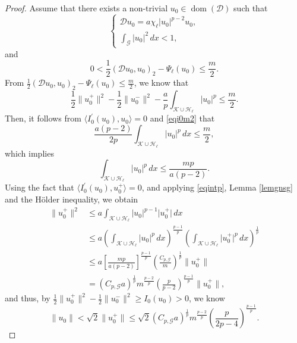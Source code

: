 \documentclass[11pt]{amsart}
\newcommand{\abs}[1]{\lvert#1\rvert}
\newcommand{\norm}[1]{\lVert#1\rVert}
\newcommand{\D}{\mathcal{D}}
\newcommand{\G}{\mathcal{G}}
\newcommand{\K}{\mathcal{K}}
\numberwithin{equation}{section}
\begin{document}
\begin{proof}
Assume that there exists a non-trivial $u_{0} \in \operatorname{dom}(\D)$ such that
    $$
\left\{\begin{array}{l}
\D u_{0}=a\chi_{\ell}\abs{u_{0}}^{p-2} u_{0}, \\
\int_{\G}\left|u_{0}\right|^{2} \,dx < 1,
\end{array}\right.
$$
and
$$
0<\frac{1}{2}(\D u_{0}, u_{0})_{2}-\Psi_\ell(u_{0})\leq\frac{m}{2}.
$$
From $\frac{1}{2}(\D u_{0}, u_{0})_{2}-\Psi_\ell(u_{0})\leq\frac{m}{2}$, we know that
\begin{equation}\label{eqi0m2}
        \frac{1}{2}\norm{u^+_{0}}^2 - \frac{1}{2}\norm{u^-_{0}}^2 - \frac{a}{p}\int_{\K\cup\mathcal{H}_\ell}\abs{u_{0}}^p \leq \frac{m}{2}.
\end{equation}
Then, it follows from $\langle I_{{0}}^{\prime}(u_{0}), u_{0}\rangle = 0$ and \eqref{eqi0m2} that
\begin{equation*}
    \frac{a(p-2)}{2p}\int_{\K\cup\mathcal{H}_\ell}\abs{u_{{0}}}^p\, dx   \leq \frac{m}{2},
\end{equation*}
which implies
\begin{equation}\label{eqintp}
\int_{\K\cup\mathcal{H}_\ell}\abs{u_{{0}}}^p\, dx \leq \frac{mp}{a(p-2)}.
\end{equation}
Using the fact that $\langle I_{{0}}^{\prime}(u_{0}), u^+_{0}\rangle = 0$, and applying \eqref{eqintp}, Lemma \ref{lemgnsg} and the H\"older inequality, we obtain
\begin{equation*}
    \begin{aligned}
    \norm{u^+_{0}}^2 &\leq a\int_{\K\cup\mathcal{H}_\ell}\abs{u_{{0}}}^{p-1}\abs{u_{{0}}^+}\, dx \\
    &\leq a(\int_{\K\cup\mathcal{H}_\ell}\abs{u_{{0}}}^p\, dx)^\frac{p-1}{p}(\int_{\K\cup\mathcal{H}_\ell}\abs{u_{{0}}^+}^p\, dx)^\frac{1}{p} \\
    &\leq a\left[\frac{mp }{a(p-2)}\right]^\frac{p-1}{p}\left(\frac{C_{p,\G}}{m}\right)^\frac{1}{p}\norm{u^+_{0}}\\
    &= (C_{p,\G}a)^\frac{1}{p} m^\frac{p-2}{p}\left(\frac{p }{p-2}\right)^\frac{p-1}{p}\norm{u^+_{0}},
    \end{aligned}
\end{equation*}
and thus, by $\frac{1}{2}\norm{u^+_0}^2 - \frac{1}{2}\norm{u^-_0}^2 \geq I_0(u_0) > 0$, we know
\begin{equation}\label{eqnormm2}
\norm{u_0} < \sqrt{2}\norm{u^+_0} \leq \sqrt{2}(C_{p,\G}a)^\frac{1}{p} m^\frac{p-2}{p}\left(\frac{p}{2p-4}\right)^\frac{p-1}{p}.

\end{equation}
\end{proof}
\end{document}
